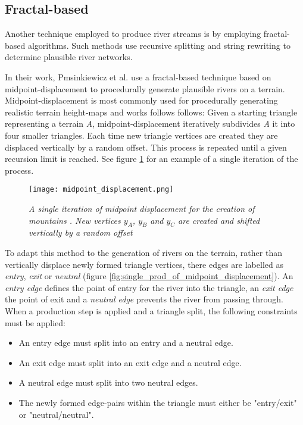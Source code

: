 \subsection{Fractal-based}

Another technique employed to produce river streams is by employing fractal-based algorithms. Such methods use recursive splitting and string rewriting to determine plausible river networks. 

In their work, Pmsinkiewicz et al. use a fractal-based technique based on midpoint-displacement to procedurally generate plausible rivers on a terrain. Midpoint-displacement is most commonly used for procedurally generating realistic terrain height-maps and works follows follows: Given a starting triangle representing a terrain \textit{A}, midpoint-displacement iteratively subdivides \textit{A} it into four smaller triangles. Each time new triangle vertices are created they are displaced vertically by a random offset. This process is repeated until a given recursion limit is reached. See figure \ref{fig:midpoint_displacement} for an example of a single iteration of the process.

\begin{figure}[h]
  \centering
	\texttt{[image: midpoint\_displacement.png]}
	\caption{\textit{A single iteration of midpoint displacement for the creation of mountains \cite{Prusinkiewicz1993}. New vertices $y_{A}$, $y_{B}$ and $y_{C}$ are created and shifted vertically by a random offset}}
	\label{fig:midpoint_displacement}
\end{figure}

To adapt this method to the generation of rivers on the terrain, rather than vertically displace newly formed triangle vertices, there edges are labelled as \textit{entry}, \textit{exit} or \textit{neutral} (figure \ref{fig:single_prod_of_midpoint_displacement}). An \textit{entry edge} defines the point of entry for the river into the triangle, an \textit{exit edge} the point of exit and a \textit{neutral edge} prevents the river from passing through. \\

When a production step is applied and a triangle split, the following constraints must be applied:
\begin{itemize}
\item An entry edge must split into an entry and a neutral edge.
\item An exit edge must split into an exit edge and a neutral edge.
\item A neutral edge must split into two neutral edges.
\item The newly formed edge-pairs within the triangle must either be "entry/exit" or "neutral/neutral".
\end{itemize}


